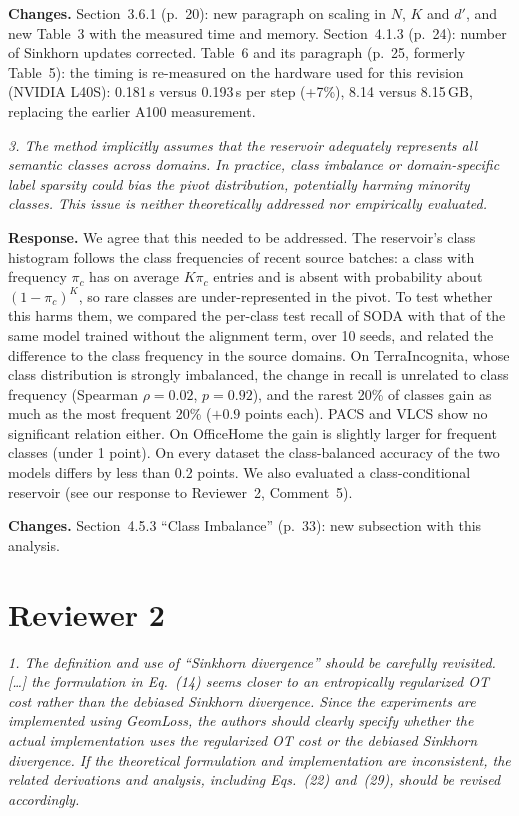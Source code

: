 \documentclass[11pt]{article}
\newenvironment{comment}{\par\medskip\noindent\begin{minipage}{\linewidth}\color{revcol}\itshape}{\end{minipage}\par\smallskip}
\newcommand{\resp}{\noindent\textbf{Response.} }
\newcommand{\chg}{\noindent\textbf{Changes.} }
\begin{document}
\chg Section~3.6.1 (p.~20): new paragraph on scaling in $N$, $K$ and $d'$, and new Table~3 with the measured time and memory. Section~4.1.3 (p.~24): number of Sinkhorn updates corrected. Table~6 and its paragraph (p.~25, formerly Table~5): the timing is re-measured on the hardware used for this revision (NVIDIA L40S): 0.181\,s versus 0.193\,s per step (+7\%), 8.14 versus 8.15\,GB, replacing the earlier A100 measurement.

\begin{comment}
3. The method implicitly assumes that the reservoir adequately represents all semantic classes across domains. In practice, class imbalance or domain-specific label sparsity could bias the pivot distribution, potentially harming minority classes. This issue is neither theoretically addressed nor empirically evaluated.
\end{comment}

\resp We agree that this needed to be addressed. The reservoir's class histogram follows the class frequencies of recent source batches: a class with frequency $\pi_c$ has on average $K\pi_c$ entries and is absent with probability about $(1-\pi_c)^K$, so rare classes are under-represented in the pivot. To test whether this harms them, we compared the per-class test recall of SODA with that of the same model trained without the alignment term, over 10 seeds, and related the difference to the class frequency in the source domains. On TerraIncognita, whose class distribution is strongly imbalanced, the change in recall is unrelated to class frequency (Spearman $\rho=0.02$, $p=0.92$), and the rarest 20\% of classes gain as much as the most frequent 20\% ($+0.9$ points each). PACS and VLCS show no significant relation either. On OfficeHome the gain is slightly larger for frequent classes (under 1 point). On every dataset the class-balanced accuracy of the two models differs by less than 0.2 points. We also evaluated a class-conditional reservoir (see our response to Reviewer~2, Comment~5).

\chg Section~4.5.3 ``Class Imbalance'' (p.~33): new subsection with this analysis.

\bigskip
\section*{Reviewer 2}

\begin{comment}
1. The definition and use of ``Sinkhorn divergence'' should be carefully revisited. [\dots] the formulation in Eq.~(14) seems closer to an entropically regularized OT cost rather than the debiased Sinkhorn divergence. Since the experiments are implemented using GeomLoss, the authors should clearly specify whether the actual implementation uses the regularized OT cost or the debiased Sinkhorn divergence. If the theoretical formulation and implementation are inconsistent, the related derivations and analysis, including Eqs.~(22) and~(29), should be revised accordingly.
\end{comment}
\end{document}
